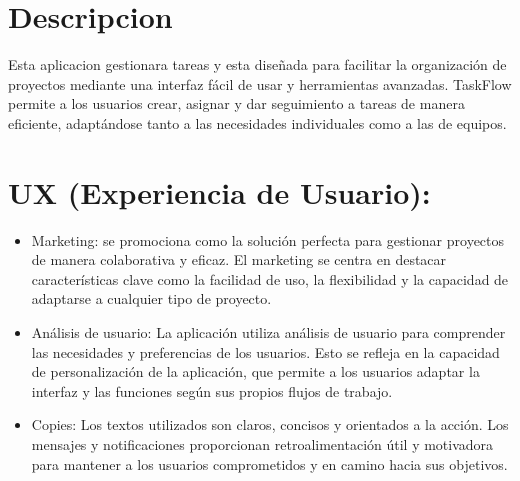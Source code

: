 \section*{Descripcion} %
	Esta aplicacion gestionara tareas y esta diseñada para facilitar la organización de proyectos mediante una interfaz fácil de usar y herramientas avanzadas. TaskFlow permite a los usuarios crear, asignar y dar seguimiento a tareas de manera eficiente, adaptándose tanto a las necesidades individuales como a las de equipos.
\label{sec:descripcion}

\section{UX (Experiencia de Usuario):} %
	\begin{itemize}
		\item Marketing: se promociona como la solución perfecta para gestionar proyectos de manera colaborativa y eficaz. El marketing se centra en destacar características clave como la facilidad de uso, la flexibilidad y la capacidad de adaptarse a cualquier tipo de proyecto.
		\item Análisis de usuario: La aplicación utiliza análisis de usuario para comprender las necesidades y preferencias de los usuarios. Esto se refleja en la capacidad de personalización de la aplicación, que permite a los usuarios adaptar la interfaz y las funciones según sus propios flujos de trabajo.
		\item Copies: Los textos utilizados son claros, concisos y orientados a la acción. Los mensajes y notificaciones proporcionan retroalimentación útil y motivadora para mantener a los usuarios comprometidos y en camino hacia sus objetivos.
	\end{itemize}
\label{sec:ux_experiencia_de_usuario_}

